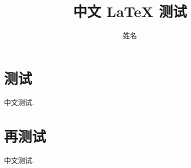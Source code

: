 \documentclass{ctexbook}
\begin{document}
 
	\title{中文 \LaTeX{} 测试} 
	\author{姓名}
\maketitle \tableofcontents 
\chapter{测试} 
中文测试. 
\chapter{再测试} 
中文测试. 
\end{document}
